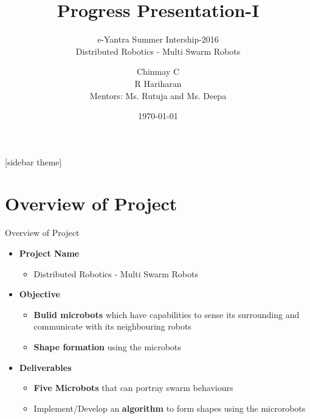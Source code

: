 \documentclass[10pt, a4paper]{beamer}
\begin{document}
	\title{Progress Presentation-I}
	\subtitle{e-Yantra Summer Intership-2016 \\ Distributed Robotics - Multi Swarm Robots}
	\author{Chinmay C\\R Hariharan\\
	Mentors: Ms. Rutuja and Ms. Deepa}
	\date{\today}
	\frame{\titlepage}

[sidebar theme]
\section{Overview of Project}
\begin{frame}{Overview of Project}
	\begin{itemize}
		\setlength\itemsep{0em}
		\item \textbf{Project Name}
			\begin{itemize} 
				\setlength\itemsep{-1em}
				\item Distributed Robotics - Multi Swarm Robots
			\end{itemize}
		\item \textbf{Objective} 
			\begin{itemize}
				\setlength\itemsep{-0.7em}
				\item \textbf{Bulid microbots} which have capabilities to sense its surrounding and communicate with its neighbouring robots
				\item \textbf{Shape formation} using the microbots
			\end{itemize}
		\item \textbf{Deliverables}
			\begin{itemize}
				\setlength\itemsep{-0.7em}
				\item \textbf{Five Microbots} that can portray swarm behaviours 
				\item Implement/Develop an \textbf{algorithm} to form shapes using the microrobots
			\end{itemize}
	\end{itemize}
\end{frame}
\end{document}
